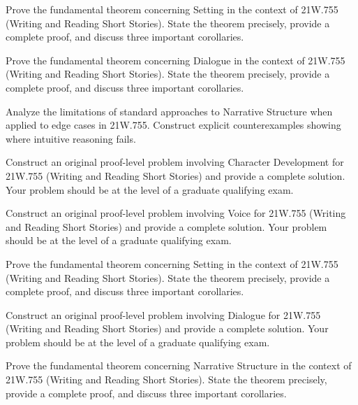 \documentclass[12pt,a4paper]{exam}
\begin{document}
\begin{questions}
\vspace{0.3cm}

\question[2]
Prove the fundamental theorem concerning Setting in the context of 21W.755 (Writing and Reading Short Stories). State the theorem precisely, provide a complete proof, and discuss three important corollaries.

\vspace{0.3cm}

\question[5]
Prove the fundamental theorem concerning Dialogue in the context of 21W.755 (Writing and Reading Short Stories). State the theorem precisely, provide a complete proof, and discuss three important corollaries.

\vspace{0.3cm}

\question[3]
Analyze the limitations of standard approaches to Narrative Structure when applied to edge cases in 21W.755. Construct explicit counterexamples showing where intuitive reasoning fails.

\vspace{0.3cm}

\question[5]
Construct an original proof-level problem involving Character Development for 21W.755 (Writing and Reading Short Stories) and provide a complete solution. Your problem should be at the level of a graduate qualifying exam.

\vspace{0.3cm}

\question[4]
Construct an original proof-level problem involving Voice for 21W.755 (Writing and Reading Short Stories) and provide a complete solution. Your problem should be at the level of a graduate qualifying exam.

\vspace{0.3cm}

\question[3]
Prove the fundamental theorem concerning Setting in the context of 21W.755 (Writing and Reading Short Stories). State the theorem precisely, provide a complete proof, and discuss three important corollaries.

\vspace{0.3cm}

\question[6]
Construct an original proof-level problem involving Dialogue for 21W.755 (Writing and Reading Short Stories) and provide a complete solution. Your problem should be at the level of a graduate qualifying exam.

\vspace{0.3cm}

\question[4]
Prove the fundamental theorem concerning Narrative Structure in the context of 21W.755 (Writing and Reading Short Stories). State the theorem precisely, provide a complete proof, and discuss three important corollaries.


\end{questions}
\end{document}

